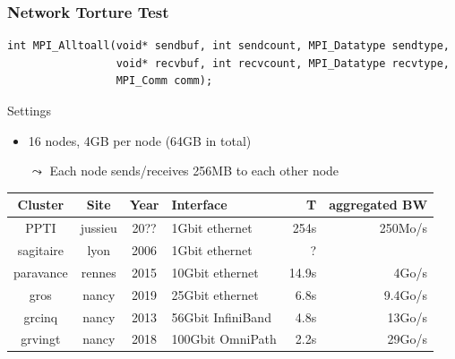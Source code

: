 \documentclass[xcolor={x11names,svgnames,psnames}]{beamer}
\newenvironment{wider}{%
\begin{adjustwidth}{-0.6cm}{}%
  \begin{minipage}{12cm}%
}{%
\end{minipage}%
\end{adjustwidth}%
}
\begin{document}

\begin{frame}[fragile]
\frametitle{Network Torture Test}

  \begin{wider}
\begin{verbatim}
int MPI_Alltoall(void* sendbuf, int sendcount, MPI_Datatype sendtype,
                 void* recvbuf, int recvcount, MPI_Datatype recvtype,
                 MPI_Comm comm);
\end{verbatim}
  \end{wider}

  \begin{alertblock}{Settings}
    \begin{itemize}  
    \item 16 nodes, 4GB per node (64GB in total)
    \item[$\leadsto$] Each node sends/receives 256MB to each other node
    \end{itemize}
  \end{alertblock}

\bigskip

\footnotesize 
\begin{tabular}{|c|c|c|l|r|r|}
  \hline
  Cluster & Site & Year & Interface & T & aggregated BW \\
  \hline
  \hline
  PPTI      & jussieu & 20?? & \phantom{00}1Gbit ethernet & 254s & 250Mo/s \\
  \pause
  sagitaire & lyon  & 2006 & \phantom{00}1Gbit ethernet   & ? &  \\
  \pause
  paravance & rennes & 2015 & \phantom{0}10Gbit ethernet   & 14.9s & 4Go/s \\
  \pause
  gros      & nancy & 2019 & \phantom{0}25Gbit ethernet   & 6.8s & 9.4Go/s \\
  \pause
  grcinq    & nancy & 2013 & \phantom{0}56Gbit InfiniBand & 4.8s & 13Go/s\\
  \pause
  grvingt   & nancy & 2018 & 100Gbit OmniPath             & 2.2s & 29Go/s \\
  \hline
\end{tabular}
\end{frame}

\end{document}
